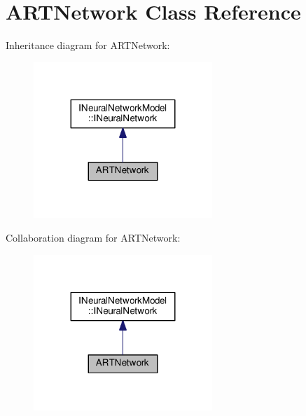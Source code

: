 \hypertarget{class_a_r_t_network}{}\section{A\+R\+T\+Network Class Reference}
\label{class_a_r_t_network}


Inheritance diagram for A\+R\+T\+Network\+:\nopagebreak
\begin{figure}[H]
\begin{center}
\leavevmode
\includegraphics[width=191pt]{class_a_r_t_network__inherit__graph}
\end{center}
\end{figure}


Collaboration diagram for A\+R\+T\+Network\+:\nopagebreak
\begin{figure}[H]
\begin{center}
\leavevmode
\includegraphics[width=191pt]{class_a_r_t_network__coll__graph}
\end{center}
\end{figure}
